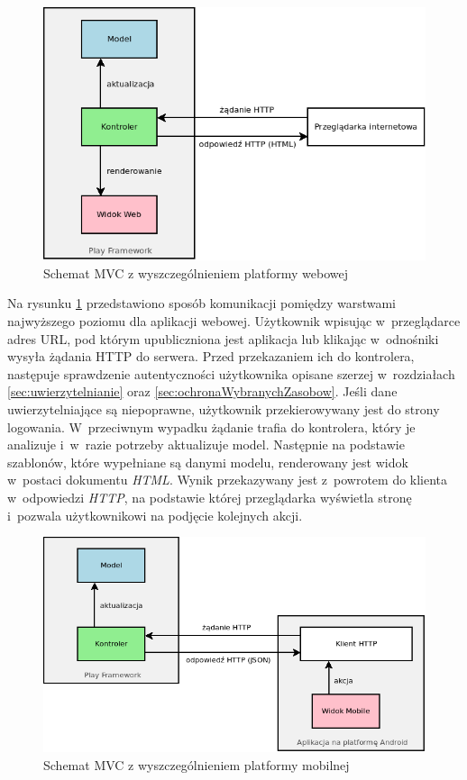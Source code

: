 \documentclass[11pt]{aghdpl}
\begin{document}
\begin{figure}[h!]
	\centering
	\includegraphics[width=\linewidth * 4/5]{MVC-WEB}
	\caption{Schemat MVC z wyszczególnieniem platformy webowej}
	\label{fig:mvc-web}
\end{figure}

Na rysunku \ref{fig:mvc-web} przedstawiono sposób komunikacji pomiędzy warstwami najwyższego poziomu dla aplikacji webowej. Użytkownik wpisując w~przeglądarce adres URL, pod którym upubliczniona jest aplikacja lub klikając w~odnośniki wysyła żądania HTTP do serwera. Przed przekazaniem ich do kontrolera, następuje sprawdzenie autentyczności użytkownika opisane szerzej w~rozdziałach \ref{sec:uwierzytelnianie} oraz \ref{sec:ochronaWybranychZasobow}. Jeśli dane uwierzytelniające są niepoprawne, użytkownik przekierowywany jest do strony logowania. W~przeciwnym wypadku żądanie trafia do kontrolera, który je analizuje i~w~razie potrzeby aktualizuje model. Następnie na podstawie szablonów, które wypełniane są danymi modelu, renderowany jest widok w~postaci dokumentu \emph{HTML}. Wynik przekazywany jest z~powrotem do klienta w~odpowiedzi \emph{HTTP}, na podstawie której przeglądarka wyświetla stronę i~pozwala użytkownikowi na podjęcie kolejnych akcji.

\begin{figure}[h!]
	\centering
	\includegraphics[width=\linewidth * 4/5]{MVC-MOBILE}
	\caption{Schemat MVC z wyszczególnieniem platformy mobilnej}
	\label{fig:mvc-mobile}
\end{figure}
\end{document}
